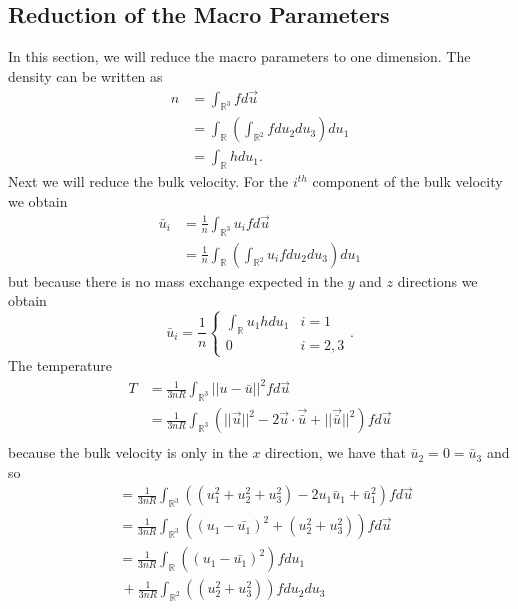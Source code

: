 \subsection{Reduction of the Macro Parameters}
In this section, we will reduce the macro parameters to one dimension. The density can be written as
%
\begin{align*}
n &= \int_{\mathbb{R}^3} f d\vec{u}\\
&= \int_{\mathbb{R}} \left( \int_{\mathbb{R}^2} f du_2 du_3 \right) du_1\\
&= \int_{\mathbb{R}} h du_1.
\end{align*}
%
Next we will reduce the bulk velocity. For the $i^{th}$ component of the bulk velocity we obtain
%
\begin{align*}
\bar{u}_i &= \frac{1}{n} \int_{\mathbb{R}^3} u_i f d\vec{u}\\
&= \frac{1}{n} \int_{\mathbb{R}} \left( \int_{\mathbb{R}^2} u_i f du_2 du_3 \right) du_1
\end{align*}
%
but because there is no mass exchange expected in the $y$ and $z$ directions we obtain
%
\begin{equation*}
\bar{u}_i = \frac{1}{n} \left \{ \begin{array}{cc} \int_{\mathbb{R}} u_1 h du_1 & i=1\\ 0 & i = 2,3 \end{array} \right. .
\end{equation*}
%
The temperature
%
\begin{align*}
T &= \frac{1}{3 n R} \int_{\mathbb{R}^3} ||u - \bar{u}||^2 f d\vec{u}\\
&= \frac{1}{3 n R} \int_{\mathbb{R}^3} \left( ||\vec{u}||^2 - 2 \vec{u} \cdot \vec{\bar{u}} + ||\vec{\bar{u}}||^2 \right) f d\vec{u}\\
\end{align*}
%
because the bulk velocity is only in the $x$ direction, we have that $\bar{u}_2 = 0 = \bar{u}_3$ and so
%
\begin{align*}
&= \frac{1}{3 n R} \int_{\mathbb{R}^3} \left( (u_1^2 + u_2^2 + u_3^2) - 2 u_1 \bar{u}_1 + \bar{u}_1^2 \right) f d\vec{u}\\
&= \frac{1}{3 n R} \int_{\mathbb{R}^3} \left( (u_1 - \bar{u_1})^2 + (u_2^2 + u_3^2)\right) f d\vec{u}\\
&= \frac{1}{3 n R} \int_{\mathbb{R}} \left( (u_1 - \bar{u_1})^2 \right) f du_1\\
& \, + \frac{1}{3 n R} \int_{\mathbb{R}^2} \left( (u_2^2 + u_3^2)\right) f du_2 du_3
\end{align*}
